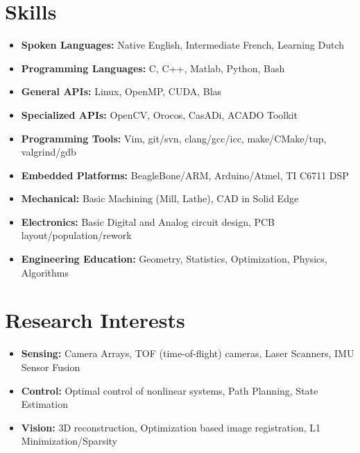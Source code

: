 \documentclass[line,lm,rm,11pt]{res} %
\def\spaceline{\vspace{1mm} \fullline}
\begin{document}
\begin{resume}
\section{Skills}
	\begin{itemize}
	\item 
	\spaceline
	{\bf Spoken Languages: } Native English, Intermediate French,  Learning Dutch
\item {\bf Programming Languages: } C, C++, Matlab, Python, Bash
\item {\bf General APIs: } Linux, OpenMP, CUDA, Blas
\item {\bf Specialized APIs: } OpenCV, Orocos, CasADi, ACADO Toolkit
\item {\bf Programming Tools: } Vim, git/svn, clang/gcc/icc, make/CMake/tup, valgrind/gdb
\item {\bf Embedded Platforms: } BeagleBone/ARM, Arduino/Atmel, TI C6711 DSP
\item {\bf Mechanical: } Basic Machining (Mill, Lathe), CAD in Solid Edge
\item {\bf Electronics: } Basic Digital and Analog circuit design, PCB layout/population/rework
\item {\bf Engineering Education: } Geometry, Statistics, Optimization, Physics, Algorithms
\end{itemize}

\section{Research Interests}
\begin{itemize}
\item 
	\spaceline
	{\bf Sensing:} Camera Arrays, TOF (time-of-flight) cameras, Laser Scanners, IMU Sensor Fusion
\item 
	{\bf Control:} Optimal control of nonlinear systems, Path Planning, State Estimation
\item 
	{\bf Vision:} 3D reconstruction, Optimization based image registration, L1 Minimization/Sparsity
\end{itemize}


\end{resume}
\end{document}
